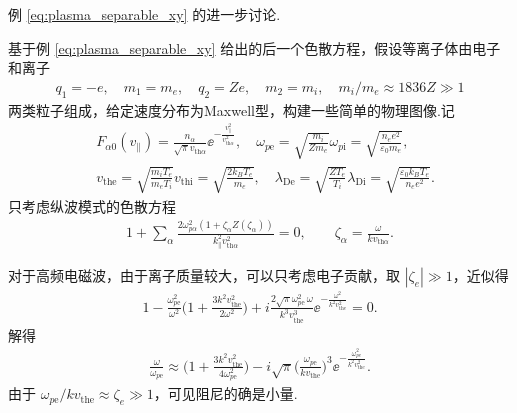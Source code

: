 \begin{exbox}
	例 \cref{eq:plasma_separable_xy} 的进一步讨论.

	基于例 \cref{eq:plasma_separable_xy} 给出的后一个色散方程，假设等离子体由电子和离子
	\begin{align*}
		q_1=-e,\quad m_1=m_e,\quad q_2=Ze,\quad m_2=m_i,\quad m_i/m_e\approx1836Z\gg1
	\end{align*}
	两类粒子组成，给定速度分布为Maxwell型，构建一些简单的物理图像.记
	\begin{align*}
		&F_{\alpha0}(v_{\parallel}) = \frac{n_\alpha}{\sqrt{\pi}v_{\mathrm{th}\alpha}}\ee^{-\frac{v_{\parallel}^2}{v_{\mathrm{th}\alpha}^2}},\quad \omega_{p\mathrm{e}} = \sqrt{\frac{m_i}{Zm_e}}\omega_{p\mathrm{i}} = \sqrt{\frac{n_e e^2}{\varepsilon_0 m_e}},\\
		&v_{\mathrm{the}} = \sqrt{\frac{m_i T_e}{m_e T_i}}v_{\mathrm{thi}} = \sqrt{\frac{2k_B T_e}{m_e}},\quad \lambda_{\mathrm{De}} = \sqrt{\frac{ZT_e}{T_i}}\lambda_{\mathrm{Di}} = \sqrt{\frac{\varepsilon_0 k_B T_e}{n_e e^2}}.
	\end{align*}
	只考虑纵波模式的色散方程
	\begin{align*}
		1 + \sum_\alpha\frac{2\omega_{p\alpha}^2\left(1+\zeta_\alpha Z(\zeta_\alpha)\right)}{k_{\parallel}^2v_{\mathrm{th}\alpha}^2}=0,\qquad \zeta_\alpha = \frac{\omega}{k v_{\mathrm{th}\alpha}}.
	\end{align*}

	对于高频电磁波，由于离子质量较大，可以只考虑电子贡献，取 \(|\zeta_e|\gg1\)，近似得
	\begin{align*}
		1 - \frac{\omega_{p\mathrm{e}}^2}{\omega^2}\bigg(1+\frac{3k^2v_{\mathrm{the}}^2}{2\omega^2}\bigg) + i\frac{2\sqrt{\pi}\omega_{p\mathrm{e}}^2\,\omega}{k^3v_{\mathrm{the}}^3}\ee^{-\frac{\omega^2}{k^2v_{\mathrm{the}}^2}} = 0.
	\end{align*}
	解得
	\begin{align*}
		\frac{\omega}{\omega_{p\mathrm{e}}}\approx\bigg(1+\frac{3k^2v_{\mathrm{the}}^2}{4\omega_{p\mathrm{e}}^2}\bigg) - i\sqrt{\pi}\bigg(\frac{\omega_{p\mathrm{e}}}{k v_{\mathrm{the}}}\bigg)^3\ee^{-\frac{\omega_{p\mathrm{e}}^2}{k^2v_{\mathrm{the}}^2}}.
	\end{align*}
	由于 \(\omega_{p\mathrm{e}}/k v_{\mathrm{the}}\approx\zeta_e\gg1\)，可见阻尼的确是小量.


\end{exbox}
